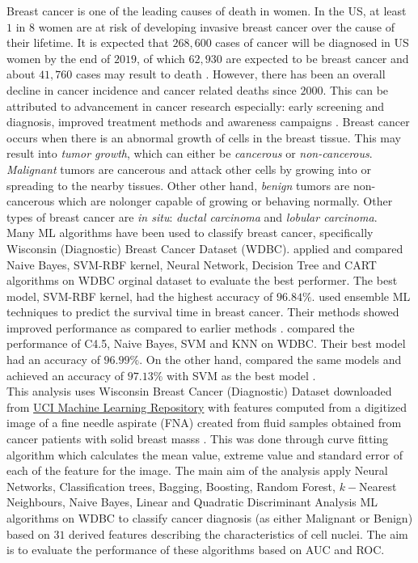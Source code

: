 \noindent Breast cancer is one of the leading causes of death in women. In the US, at least $1$ in $8$ women are at risk of developing invasive breast cancer over the cause of their lifetime. It is expected that $268,600$ cases of cancer will be diagnosed in US women by the end of $2019$, of which $62,930$ are expected to be breast cancer and about $41,760$ cases may result to death \citep{uscancer2019}. However, there has been an overall decline in cancer incidence and cancer related deaths since $2000$. This can be attributed to advancement in cancer research especially: early screening and diagnosis, improved treatment methods and awareness campaigns \citep{asri2016using}. Breast cancer occurs when there is an abnormal growth of cells in the breast tissue. This may result into \textit{tumor growth}, which can either be \textit{cancerous} or \textit{non-cancerous}. \textit{Malignant} tumors are cancerous and attack other cells by growing into or spreading to the nearby tissues. Other other hand, \textit{benign} tumors are non-cancerous which are nolonger capable of growing or behaving normally. Other types of breast cancer are \textit{in situ}: \textit{ductal carcinoma} and \textit{lobular carcinoma}.\\

\noindent Many ML algorithms have been used to classify breast cancer, specifically Wisconsin (Diagnostic) Breast Cancer Dataset (WDBC). \citeauthor{chaurasia2017data} applied and compared Naive Bayes, SVM-RBF kernel, Neural Network, Decision Tree and CART algorithms on WDBC orginal dataset to evaluate the best performer. The best model, SVM-RBF kernel, had the highest accuracy of $96.84\%$. \citeauthor{djebbari2008ensemble} used ensemble ML techniques to predict the survival time in breast cancer. Their methods showed improved performance as compared to earlier methods \citep{asri2016using}. \citeauthor{aruna2011knowledge} compared the performance of C4.5, Naive Bayes, SVM and KNN on WDBC. Their best model had an accuracy of $96.99\%$. On the other hand, \citeauthor{asri2016using} compared the same models and achieved an accuracy of $97.13\%$ with SVM as the best model \citep{asri2016using}.\\


\noindent This analysis uses  Wisconsin Breast Cancer (Diagnostic) Dataset downloaded from \href{https://archive.ics.uci.edu/ml/datasets/Breast+Cancer+Wisconsin+(Diagnostic)}{UCI Machine Learning Repository} with features computed from a digitized image of a fine needle aspirate (FNA) created from fluid samples obtained from cancer patients with solid breast masss \citep{ucidata}. This was done through curve fitting algorithm which calculates the mean value, extreme value and standard error of each of the feature for the image. The main aim of the analysis apply Neural Networks, Classification trees, Bagging, Boosting, Random Forest, $k-$Nearest Neighbours, Naive Bayes, Linear and Quadratic Discriminant Analysis ML algorithms on WDBC to classify cancer diagnosis (as either Malignant or Benign) based on $31$ derived features describing the characteristics of cell nuclei. The aim is to evaluate the performance of these algorithms  based on AUC and ROC.

